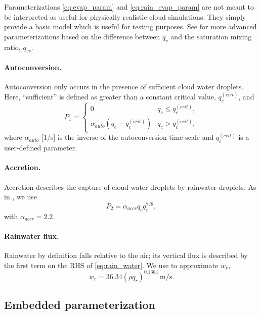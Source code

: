 \begin{rem}
Parameterizations \eqref{eq:evap_param} and \eqref{eq:rain_evap_param} are not meant to be interpreted as useful for physically realistic cloud simulations. 
They simply provide a basic model which is useful for testing purposes.
See \cite{SoongOgura1973,KlempWilhelmson1978} for more advanced parameterizations based on the difference between $q_v$ and the saturation mixing ratio, $q_{vs}$.
\end{rem}

\paragraph{Autoconversion.} Autoconversion only occurs in the presence of sufficient cloud water droplets.
Here, ``sufficient'' is defined as greater than a constant critical value, $q_c^{(crit)}$, and \cite[eqn.~(12)]{Srivastava1967}
\begin{equation}
  P_1 = \begin{cases}
    0 & q_c \le q_c^{(crit)}, \\
    \alpha_{auto}(q_c - q_c^{(crit)}) & q_c > q_c^{(crit)},
  \end{cases}
\end{equation}
where $\alpha_{auto}$ [1/s] is the inverse of the autoconversion time scale and $q_c^{(crit)}$ is a user-defined parameter.

\paragraph{Accretion.} Accretion describes the capture of cloud water droplets by rainwater droplets.
As in \cite{SoongOgura1973,KlempWilhelmson1978}, we use
\begin{equation}
  P_2 = \alpha_{accr}q_cq_r^{7/8},
\end{equation}
with $\alpha_{accr} = 2.2$.

\paragraph{Rainwater flux.} Rainwater by definition falls relative to the air; its vertical flux is described by the first term on the RHS of \eqref{eq:rain_water}.
  We use \cite[eqns.~(14),(15)]{SoongOgura1973} to approximate $w_r$,
  \begin{equation}
    w_r = 36.34 (\rho q_r)^{0.1364} ~\text{m/s}.
  \end{equation}
  

\subsection{Embedded parameterization}
